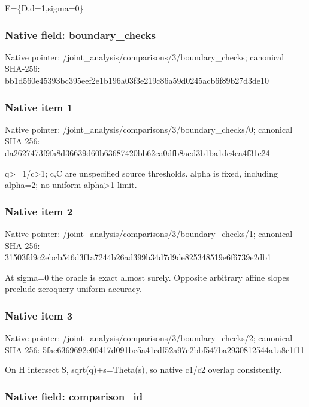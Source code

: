 \documentclass[10pt,a4paper]{article}
\begin{document}
E=\{D,d=1,sigma=0\}


\subsubsection{Native field: boundary\_checks}


Native pointer: /joint\_analysis/comparis\allowbreak{}ons/3/boundary\_checks; canonical SHA-256: bb1d560e45393bc395eef2e1\allowbreak{}b196a03f3e219c86a59d0245\allowbreak{}acb6f89b27d3de10



\subsubsection{Native item 1}


Native pointer: /joint\_analysis/comparis\allowbreak{}ons/3/boundary\_checks/0; canonical SHA-256: da2627473f9fa8d36639d60b\allowbreak{}63687420bb62ea0dfb8acd3b\allowbreak{}1ba1de4ea4f31e24


q>=1/c>1; c,C are unspecified source thresholds. alpha is fixed, including alpha=2; no uniform alpha>1 limit.


\subsubsection{Native item 2}


Native pointer: /joint\_analysis/comparis\allowbreak{}ons/3/boundary\_checks/1; canonical SHA-256: 31503fd9c2ebcb546d3f1a72\allowbreak{}44b26ad399b34d7d9de82534\allowbreak{}8519e6f6739e2db1


At sigma=0 the oracle is exact almost surely. Opposite arbitrary affine slopes preclude zeroquery uniform accuracy.


\subsubsection{Native item 3}


Native pointer: /joint\_analysis/comparis\allowbreak{}ons/3/boundary\_checks/2; canonical SHA-256: 5fac6369692e00417d091be5\allowbreak{}a41cdf52a97e2bbf547ba293\allowbreak{}0812544a1a8c1f11


On H intersect S, sqrt(q)+s=Theta(s), so native c1/c2 overlap consistently.


\subsubsection{Native field: comparison\_id}
\end{document}
